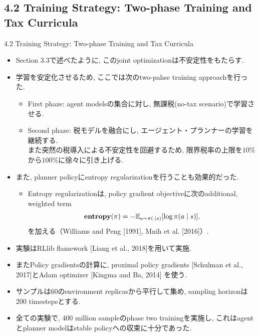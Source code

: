 \documentclass[unicode,aspectratio=169,11pt]{beamer}
\begin{document}
\subsection{4.2 Training Strategy: Two-phase Training and Tax Curricula}
\begin{frame}{4.2 Training Strategy: Two-phase Training and Tax Curricula}
\begin{itemize}
    \item Section 3.3で述べたように, このjoint optimizationは不安定性をもたらす.
    \item 学習を安定化させるため, ここでは次のtwo-pahse training approachを行った.
    \begin{itemize}
        \item First phaze: agent modelsの集合に対し, 無課税(no-tax scenario)で学習させる.
        \item Second phaze: 税モデルを融合にし, エージェント・プランナーの学習を継続する.\\
                また突然の税導入による不安定性を回避するため, 限界税率の上限を$10\%$から$100\%$に徐々に引き上げる.
    \end{itemize}
    \item また, planner policyにentropy regularizationを行うことも効果的だった.
    \begin{itemize}
        \item Entropy regularizationは, policy gradient objectiveに次のadditional, weighted term
        \[ {\bf entropy}(\pi) = - \mathbb{E}_{a \sim \pi(\cdot \mid s)} [\log\pi(a \mid s)]. \]
        を加える（Williams and Peng [1991], Mnih et al. [2016]）.
    \end{itemize}
\end{itemize}
\end{frame}

\begin{frame}{}{}
\begin{itemize}
    \item 実験はRLlib flamework [Liang et al., 2018]を用いて実施.
    \item またPolicy gradientsの計算に, proximal policy gradients [Schulman et al., 2017]とAdam optimizer [Kingma and Ba, 2014] を使う.
    \item サンプルは60のenvironment replicasから平行して集め, sampling horizonは200 timestepsとする.
    \item 全ての実験で, 400 million sampleのphase two trainingを実施し, これはagentとplanner modelはstable policyへの収束に十分であった.
\end{itemize}
\end{frame}
\end{document}
